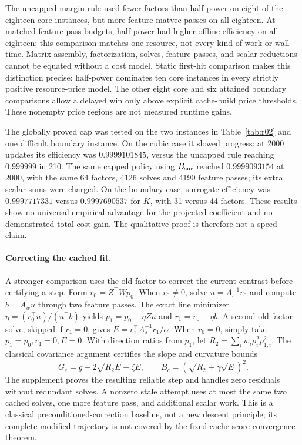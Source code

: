 \documentclass[11pt]{article}
\begin{document}
The uncapped margin rule used fewer factors than half-power on eight of the eighteen core instances, but more feature matvec passes on all eighteen. At matched feature-pass budgets, half-power had higher offline efficiency on all eighteen; this comparison matches one resource, not every kind of work or wall time. Matrix assembly, factorization, solves, feature passes, and scalar reductions cannot be equated without a cost model. Static first-hit comparison makes this distinction precise: half-power dominates ten core instances in every strictly positive resource-price model. The other eight core and six attained boundary comparisons allow a delayed win only above explicit cache-build price thresholds. These nonempty price regions are not measured runtime gains.

The globally proved cap was tested on the two instances in Table~\ref{tab:r02} and one difficult boundary instance. On the cubic case it slowed progress: at 2000 updates its efficiency was $0.9999101845$, versus the uncapped rule reaching $0.999999$ in 210. The same capped policy using $B_{\rm sur}$ reached $0.9999093154$ at 2000, with the same 64 factors, 4126 solves and 4190 feature passes; its extra scalar sums were charged. On the boundary case, surrogate efficiency was $0.9997717331$ versus $0.9997690537$ for $K$, with 31 versus 44 factors. These results show no universal empirical advantage for the projected coefficient and no demonstrated total-cost gain. The qualitative proof is therefore not a speed claim.

\paragraph{Correcting the cached fit.}
A stronger comparison uses the old factor to correct the current contrast before certifying a step. Form $r_0=Z^\top Wp_0$. When $r_0\ne0$, solve $u=A_s^{-1}r_0$ and compute $b=A_wu$ through two feature passes. The exact line minimizer $\eta=(r_0^\top u)/(u^\top b)$ yields $p_1=p_0-\eta Zu$ and $r_1=r_0-\eta b$. A second old-factor solve, skipped if $r_1=0$, gives $E=r_1^\top A_s^{-1}r_1/\alpha$. When $r_0=0$, simply take $p_1=p_0,r_1=0,E=0$. With direction ratios from $p_1$, let $R_2=\sum_i w_i\rho_i^2p_{1,i}^2$. The classical covariance argument certifies the slope and curvature bounds
\[
 G_c=g-2\sqrt{R_2E}-\zeta E,\qquad
 B_c=(\sqrt{R_2}+\gamma\sqrt E)^2.
\]
The supplement proves the resulting reliable step and handles zero residuals without redundant solves. A nonzero stale attempt uses at most the same two cached solves, one more feature pass, and additional scalar work. This is a classical preconditioned-correction baseline, not a new descent principle; its complete modified trajectory is not covered by the fixed-cache-score convergence theorem.
\end{document}
